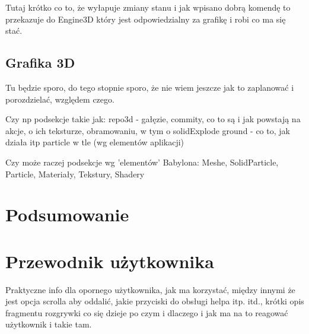 \documentclass[11pt,a4paper,polish,thesis]{dcsbook}
\begin{document}
	Tutaj krótko co to, że wyłapuje zmiany stanu i jak wpisano dobrą komendę to przekazuje do Engine3D który jest odpowiedzialny za grafikę i robi co ma się stać.
	
	\section{Grafika 3D}
	Tu będzie sporo, do tego stopnie sporo, że nie wiem jeszcze jak to zaplanować i porozdzielać, względem czego.
	
	Czy np podsekcje takie jak:
	repo3d - gałęzie, commity, co to są i jak powstają na akcje, o ich teksturze, obramowaniu, w tym o solidExplode
	ground - co to, jak działa itp
	particle w tle
	(wg elementów aplikacji)
	
	Czy może raczej podsekcje wg 'elementów' Babylona:
	Meshe, SolidParticle, Particle, Materiały, Tekstury, Shadery
	
	
	\chapter{Podsumowanie}
	
	\appendix
	
	\chapter{Przewodnik użytkownika}
	
	Praktyczne info dla opornego użytkownika, jak ma korzystać, między innymi że jest opcja scrolla aby oddalić, jakie przyciski do obsługi helpa itp. itd., krótki opis fragmentu rozgrywki co się dzieje po czym i dlaczego i jak ma na to reagować użytkownik i takie tam.
	
	\backmatter
	
\end{document}
